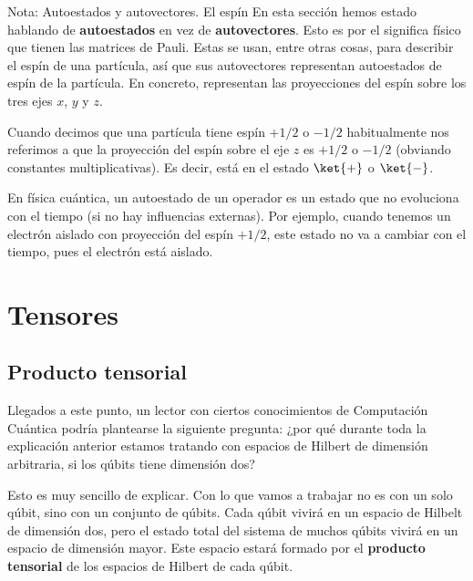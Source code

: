 \documentclass[a4paper,11pt]{book} %
\numberwithin{equation}{chapter}
\begin{document}
	\begin{mybox_blue}{Nota: Autoestados y autovectores. El espín}
	En esta sección hemos estado hablando de \textbf{autoestados} en vez de \textbf{autovectores}. Esto es 
	por el significa físico que tienen las matrices de Pauli. Estas se usan, entre otras cosas, para 
	describir el espín de una partícula, así que sus autovectores representan autoestados de espín de la partícula. 
	En concreto, representan las proyecciones del espín sobre los tres ejes $x$, $y$ y $z$. 	
	\vspace{0.3cm}

	Cuando decimos que una partícula tiene espín $+1/2$ o $-1/2$ habitualmente nos referimos a que la proyección
	del espín sobre el eje $z$ es $+1/2$ o $-1/2$ (obviando constantes multiplicativas). Es decir, está en el 
	estado $\ket{+}$ o $\ket{-}$.
	\vspace{0.3cm}
	
	En física cuántica, un autoestado de un operador es un estado que no evoluciona con el tiempo (si no hay influencias externas). 
	Por ejemplo, cuando tenemos un electrón aislado con proyección del espín $+1/2$, este estado no va a cambiar con el tiempo,
	pues el electrón está aislado. 
	\end{mybox_blue}




		
	
	\section{Tensores}
	
		\subsection{Producto tensorial}

Llegados a este punto, un lector con ciertos conocimientos de Computación Cuántica podría plantearse la siguiente pregunta: ¿por qué durante toda la explicación anterior estamos tratando con espacios de Hilbert de dimensión arbitraria, si los qúbits tiene dimensión dos? 

Esto es muy sencillo de explicar. Con lo que vamos a trabajar no es con un solo qúbit, sino con un conjunto de qúbits. Cada qúbit vivirá en un espacio de Hilbelt de dimensión dos, pero el estado total del sistema de muchos qúbits vivirá en un espacio de dimensión mayor. Este espacio estará formado por el \textbf{producto tensorial} de los espacios de Hilbert de cada qúbit.
\end{document}
